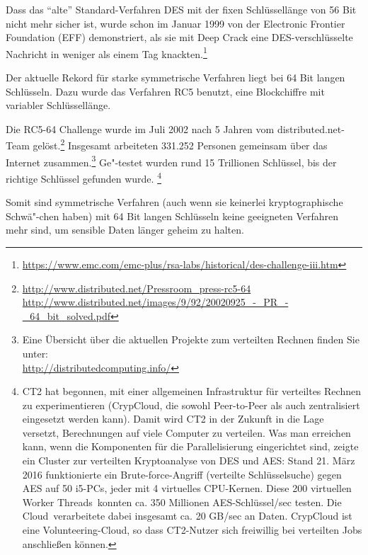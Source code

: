 \begin{refsegment}
Dass das "`alte"' Standard-Verfahren DES mit der fixen Schlüssellänge
von 56 Bit nicht mehr sicher ist, wurde schon im Januar 1999 von der
Electronic Frontier Foundation (EFF) demonstriert, als sie mit Deep Crack
eine DES-verschlüsselte Nachricht in weniger als einem Tag
knackten.\footnote{%
  \url{https://www.emc.com/emc-plus/rsa-labs/historical/des-challenge-iii.htm}
}

Der aktuelle Rekord für starke symmetrische Verfahren liegt bei 64 Bit
langen Schlüsseln. Dazu wurde das Verfahren RC5 benutzt, eine
Blockchiffre mit variabler Schlüssellänge.

Die RC5-64 Challenge wurde im Juli 2002 nach 5 Jahren vom
distributed.net-Team gelöst.\footnote{%
 \url{http://www.distributed.net/Pressroom_press-rc5-64}\\
 \url{http://www.distributed.net/images/9/92/20020925_-_PR_-_64_bit_solved.pdf}
}
Insgesamt arbeiteten 331.252 Personen gemeinsam über das Internet
zusammen.\footnote{%
Eine Übersicht über die aktuellen Projekte zum verteilten Rechnen finden
Sie unter:\\
\url{http://distributedcomputing.info/}
}
Ge"-testet wurden rund 15 Trillionen Schlüssel, bis der
richtige Schlüssel gefunden wurde.%
\footnote{%
  CT2 hat begonnen, mit einer allgemeinen Infrastruktur für verteiltes
  Rechnen zu experimentieren (CrypCloud, die sowohl Peer-to-Peer
  als auch zentralisiert eingesetzt werden kann). Damit wird CT2 in der Zukunft in die
  Lage versetzt, Berechnungen auf viele Computer zu verteilen.
  Was man erreichen kann, wenn die Komponenten für die Parallelisierung eingerichtet
  sind, zeigte ein Cluster zur verteilten Kryptoanalyse von DES und AES:
  Stand 21. März 2016 funktionierte ein Brute-force-Angriff (verteilte Schlüsselsuche)
  gegen AES auf 50 i5-PCs, jeder mit 4 virtuelles CPU-Kernen. Diese 200 virtuellen
  \glqq Worker Threads\grqq~konnten ca. 350 Millionen AES-Schlüssel/sec testen. Die
  \glqq Cloud\grqq~verarbeitete dabei insgesamt ca. 20 GB/sec an Daten. CrypCloud
  ist eine Volunteering-Cloud, so dass CT2-Nutzer sich freiwillig bei
  verteilten Jobs anschließen können.
}


Somit sind symmetrische Verfahren (auch wenn sie keinerlei
kryptographische Schwä"-chen haben) mit 64 Bit langen Schlüsseln
keine geeigneten Verfahren mehr sind, um sensible Daten länger geheim
zu halten.




\newpage

\end{refsegment}
